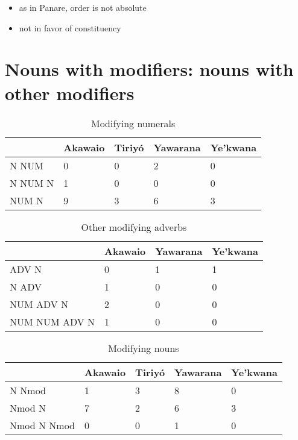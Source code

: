 \documentclass[10pt]{article}
\begin{document}
\begin{itemize}
\tightlist
\item
  as in Panare, order is not absolute
\item
  not in favor of constituency
\end{itemize}

\section{Nouns with modifiers: nouns with other modifiers}

\begin{table}
\caption{Modifying numerals}
\label{tab:nummod}
\centering
\begin{tabular}{lllll}
\toprule
        & Akawaio & Tiriyó & Yawarana & Ye'kwana \\
\midrule
  N NUM &       0 &      0 &        2 &        0 \\
N NUM N &       1 &      0 &        0 &        0 \\
  NUM N &       9 &      3 &        6 &        3 \\
\bottomrule
\end{tabular}

\end{table}

\begin{table}
\caption{Other modifying adverbs}
\label{tab:advmod}
\centering
\begin{tabular}{llll}
\toprule
              & Akawaio & Yawarana & Ye'kwana \\
\midrule
        ADV N &       0 &        1 &        1 \\
        N ADV &       1 &        0 &        0 \\
    NUM ADV N &       2 &        0 &        0 \\
NUM NUM ADV N &       1 &        0 &        0 \\
\bottomrule
\end{tabular}

\end{table}

\begin{table}
\caption{Modifying nouns}
\label{tab:nmod}
\centering
\begin{tabular}{lllll}
\toprule
            & Akawaio & Tiriyó & Yawarana & Ye'kwana \\
\midrule
     N Nmod &       1 &      3 &        8 &        0 \\
     Nmod N &       7 &      2 &        6 &        3 \\
Nmod N Nmod &       0 &      0 &        1 &        0 \\
\bottomrule
\end{tabular}

\end{table}
\end{document}
